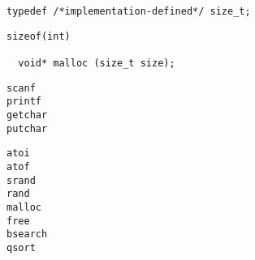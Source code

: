\begin{frame}[fragile]{}
  \centerline{\large {}}

  \begin{lstlisting}[style = Cstyle]
  typedef /*implementation-defined*/ size_t;
  \end{lstlisting}

  \pause
  \vspace{0.30cm}
  \begin{lstlisting}[style = Cstyle]
  sizeof(int)

  void* malloc (size_t size);
  \end{lstlisting}
\end{frame}

\begin{frame}{}
  \centerline{\large {}}

  \begin{center}
    {\large
    \texttt{scanf}\\[0.10cm]
    \texttt{printf}\\[0.40cm]

    \texttt{getchar}\\[0.10cm]
    \texttt{putchar}\\[0.40cm]


    }
  \end{center}
\end{frame}

\begin{frame}{}
  \centerline{\large {}}

  \begin{center}
    {\large
    \texttt{atoi}\\[0.10cm]
    \texttt{atof}\\[0.40cm]

    \texttt{srand}\\[0.10cm]
    \texttt{rand}\\[0.40cm]

    \texttt{malloc}\\[0.10cm]
    \texttt{free}\\[0.40cm]

    \texttt{bsearch}\\[0.10cm]
    \texttt{qsort}
    }
  \end{center}
\end{frame}

